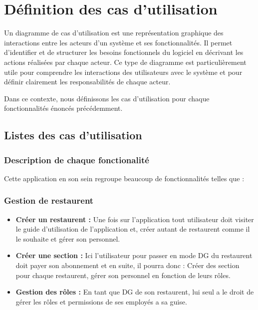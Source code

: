 \section{D\'efinition des cas d'utilisation}

Un diagramme de cas d'utilisation est une représentation graphique des interactions entre les acteurs d'un système et ses fonctionnalités. Il permet d'identifier et de structurer les besoins fonctionnels du logiciel en décrivant les actions réalisées par chaque acteur. Ce type de diagramme est particulièrement utile pour comprendre les interactions des utilisateurs avec le système et pour définir clairement les responsabilités de chaque acteur.

Dans ce contexte, nous définissons les cas d'utilisation pour chaque fonctionnalités énoncés précédemment.
\subsection{Listes des cas d'utilisation}
\subsubsection{Description de chaque fonctionalité}
Cette application en son sein regroupe beaucoup de fonctionnalités telles que :
\subsubsection{Gestion de restaurent}
\begin{itemize}
    \item \textbf{Créer un restaurent :} Une fois sur l'application tout utilisateur doit visiter le guide d'utilisation de l'application et, créer autant de restaurent comme il le souhaite et gérer son personnel.
    \item \textbf{Créer une section :} Ici l'utilisateur pour passer en mode DG du restaurent doit payer son abonnement et en suite, il pourra donc : Créer des section pour chaque restaurent, gérer son personnel en fonction de leurs rôles. 
    \item \textbf{Gestion des rôles :} En tant que DG de son restaurent, lui seul a le droit de gérer les rôles et permissions de ses employés a sa guise.
\end{itemize}

